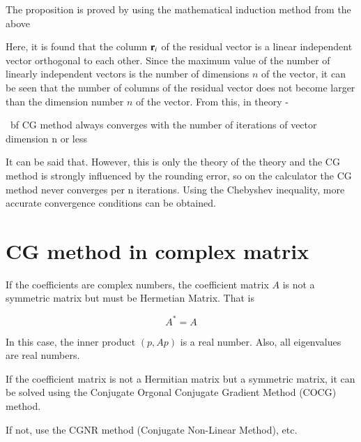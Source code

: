 The proposition is proved by using the mathematical induction method from the above



Here, it is found that the column $\mathbf{r}_i$ of the residual vector is a linear independent vector orthogonal to each other. Since the maximum value of the number of linearly independent vectors is the number of dimensions $n$ of the vector, it can be seen that the number of columns of the residual vector does not become larger than the dimension number $n$ of the vector. From this, in theory -

{\ bf CG method always converges with the number of iterations of vector dimension n or less}

It can be said that. However, this is only the theory of the theory and the CG method is strongly influenced by the rounding error, so on the calculator the CG method never converges per n iterations. Using the Chebyshev inequality, more accurate convergence conditions can be obtained.


\section{CG method in complex matrix}



If the coefficients are complex numbers, the coefficient matrix $A$ is not a symmetric matrix but must be Hermetian Matrix. That is


\begin{equation}
A^*=A
\end{equation}



In this case, the inner product $(p,Ap)$ is a real number.
Also, all eigenvalues ​​are real numbers.

If the coefficient matrix is ​​not a Hermitian matrix but a symmetric matrix, it can be solved using the Conjugate Orgonal Conjugate Gradient Method (COCG) method.

If not, use the CGNR method (Conjugate Non-Linear Method), etc.







